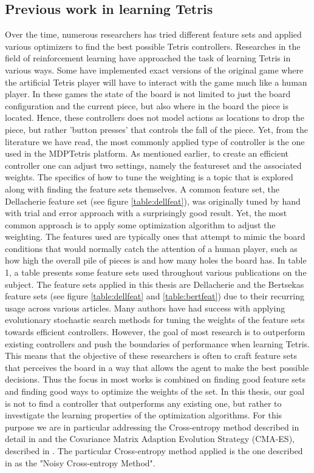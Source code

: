 \subsection{Previous work in learning Tetris\label{prevWork}}
Over the time, numerous researchers has tried different feature 
sets and applied various optimizers to find the best 
possible Tetris controllers. Researches in the field
of reinforcement learning have approached the task of learning Tetris
in various ways. Some have implemented exact versions of the original game
where the artificial Tetris player will have to interact with the 
game much like a human player. In these games the state of the board is not limited
to just the board configuration and the current piece, but also where in the 
board the piece is located. Hence, these controllers does not model actions 
as locations to drop the piece, but rather 'button presses' that controls the
fall of the piece. Yet, from the literature we have read, the most commonly applied 
type of controller is the one used in the MDPTetris platform. As mentioned earlier,
to create an efficient controller one can adjust two settings, namely the featureset 
and the associated weights. 
The specifics of how to tune the weighting is a topic that is 
explored along with finding the feature sets themselves. A common 
feature set, the Dellacherie feature set (see figure \ref{table:dellfeat}),
was originally tuned by hand with trial and error approach with a surprisingly 
good result. Yet, the most common approach is to apply some optimization 
algorithm to adjust the weighting.
The features used are typically
ones that attempt to mimic the board conditions that would
normally catch the attention of a human player, such as
how high the overall pile of pieces is and how many holes 
the board has. In \citep{scherrer2009:b} table 1, a table 
presents some feature sets used throughout various publications
on the subject. The feature sets applied in this thesis are 
Dellacherie and the Bertsekas feature sets 
(see figure \ref{table:dellfeat} and \ref{table:bertfeat}) due 
to their recurring usage across various articles.
Many authors have had success
with applying evolutionary stochastic search methods for tuning 
the weights of the feature sets towards
efficient controllers. However, the goal of most research 
is to outperform existing controllers and push the boundaries
of performance when learning Tetris. This means that the objective of
these researchers is often to craft feature sets that perceives the 
board in a way that allows the agent to make the best possible decisions.
Thus the focus in most works is combined on finding good feature sets and 
finding good ways to optimize the weights of the set. In this thesis,
our goal is not to find a controller that outperforms any existing one,
but rather to investigate the learning properties of the optimization algorithms.
For this purpose
we are in particular addressing the
Cross-entropy method described in detail in \citep{cetut2014} and the
Covariance Matrix Adaption Evolution Strategy (CMA-ES), described 
in \citep{hansen2011}. The particular Cross-entropy method applied 
is the one described in \citep{szita:06} as the "Noisy Cross-entropy Method".\\

